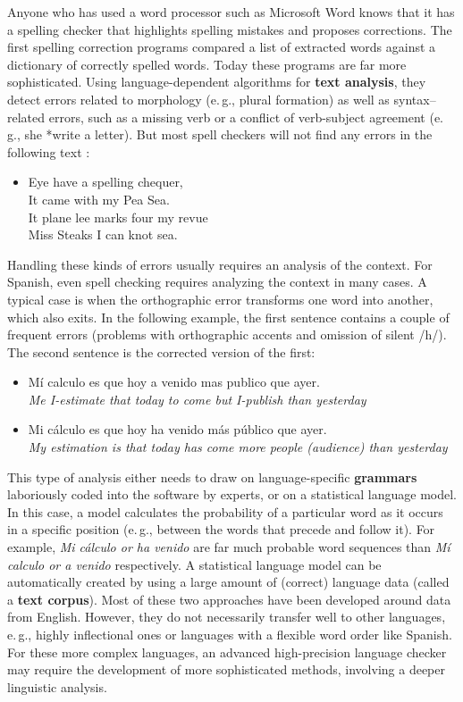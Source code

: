 \begin{multicols}{2}
Anyone who has used a word processor such as Microsoft Word knows that it has a spelling checker that highlights spelling mistakes and proposes corrections. The first spelling correction programs compared a list of extracted words against a dictionary of correctly spelled words. Today these programs are far more sophisticated. Using language-dependent algorithms for \textbf{text analysis}, they detect errors related to morphology (e.\,g., plural formation) as well as syntax--related errors, such as a missing verb or a conflict of verb-subject agreement (e.\,g., she *write a letter). But most spell checkers will not find any errors in the following text \cite{zar1}:

\begin{itemize}
\item[] Eye have a spelling chequer,\\
  It came with my Pea Sea.\\
  It plane lee marks four my revue\\
  Miss Steaks I can knot sea.
\end{itemize}

Handling these kinds of errors usually requires an analysis of the context. For Spanish, even spell checking requires analyzing the context in many cases. A typical case is when the orthographic error transforms one word into another, which also exits. In the following example, the first sentence contains a couple of frequent errors (problems with orthographic accents and omission of silent /h/). The second sentence is the corrected version of the first:
\columnbreak

\begin{itemize}
\item Mí calculo es que hoy a venido mas publico que ayer.\\
 \emph{Me I-estimate that today to come but I-publish than yesterday}
\item Mi cálculo es que hoy ha venido más público que ayer.\\
 \emph{My estimation is that today has come more people (audience) than yesterday}
\end{itemize}

This type of analysis either needs to draw on language-specific \textbf{grammars} laboriously coded into the software by experts, or on a statistical language model. In this case, a model calculates the probability of a particular word as it occurs in a specific position (e.\,g., between the words that precede and follow it). For example, \textit{Mi cálculo or ha venido} are far much probable word sequences than \textit{Mí calculo or a venido} respectively. A statistical language model can be automatically created by using a large amount of (correct) language data (called a \textbf{text corpus}). Most of these two approaches have been developed around data from English. However, they do not necessarily transfer well to other languages, e.\,g., highly inflectional ones or languages with a flexible word order like Spanish. For these more complex languages, an advanced high-precision language checker may require the development of more sophisticated methods, involving a deeper linguistic analysis. 


\end{multicols}

